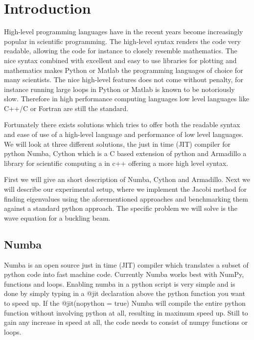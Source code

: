 \section*{Introduction}	

 High-level programming languages have in the recent years become increasingly	
popular in scientific programming. The high-level syntax renders the code very	
readable,	
allowing the code for instance to closely resemble mathematics. The nice syntax	
combined with excellent and easy to use libraries	
for plotting and mathematics makes Python or Matlab the	
programming languages of choice for many scientists.	
The nice high-level features does not come without penalty, for	
instance running large loops in Python or Matlab is known to be notoriously slow.	
Therefore in high performance computing languages low level languages like C++/C	
or Fortran are still the standard.	

 Fortunately there exists solutions which tries to offer both the readable syntax	
and ease of use of a high-level language and performance of low level languages.	
We will	
look at three different solutions, the just in time (JIT) compiler for python	
Numba, Cython which is a C based extension of python and Armadillo a	
library for scientific computing a in c++ offering a more high level syntax.	

 First we will give an short description of Numba, Cython and Armadillo.	
Next we will describe our experimental setup, where we implement the Jacobi	
method for finding eigenvalues using the aforementioned approaches and	
benchmarking them against a standard python approach. The specific problem we	
will solve is the wave equation for a buckling beam.	


 \subsection*{Numba}	
Numba is an open source just in time (JIT) compiler which translates a subset of	
python code	
into fast machine code. Currently Numba works best with NumPy, functions	
and loops. Enabling numba in a python script is very simple and is done by	
simply typing in a @jit declaration above the python function you want to speed	
up. If the @jit(nopython = true) Numba will compile the entire python function	
without involving python at all, resulting in maximum speed up. Still to gain	
any increase in speed at all, the code needs to consist of	
numpy functions or loops.	


